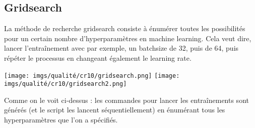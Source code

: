 \subsection{Gridsearch}
La méthode de recherche gridsearch consiste à énumérer toutes les possibilités pour un certain nombre d'hyperparamètres en machine learning. Cela veut dire, lancer l'entraînement avec par exemple, un batchsize de 32, puis de 64, puis répéter le processus en changeant également le learning rate.
\begin{center}
    \texttt{[image: imgs/qualité/cr10/gridsearch.png]}
    \texttt{[image: imgs/qualité/cr10/gridsearch2.png]}
\end{center}
Comme on le voit ci-dessus : les commandes pour lancer les entraînements sont générés (et le script les lancent séquentiellement) en énumérant tous les hyperparamètres que l'on a spécifiés.